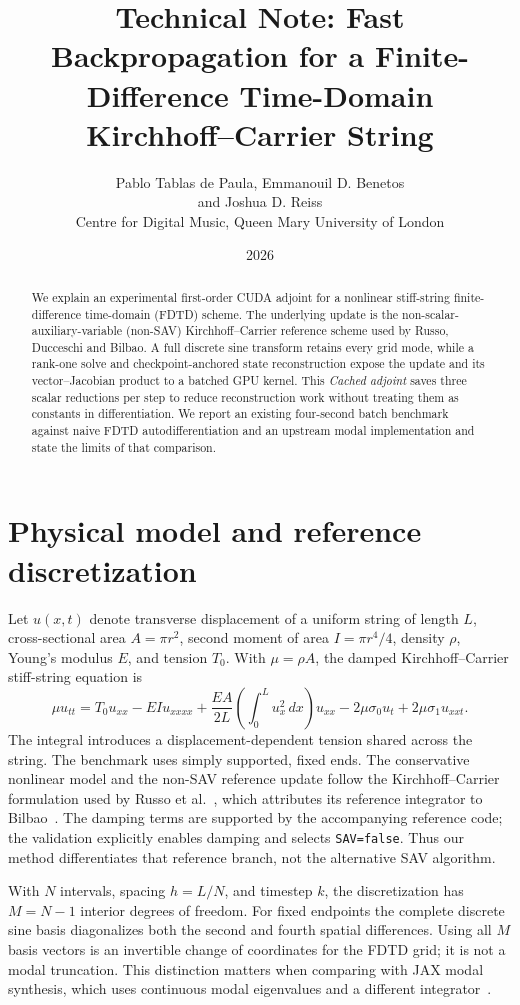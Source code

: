\documentclass[a4paper,10pt]{article}
\title{Technical Note: Fast Backpropagation for a Finite-Difference Time-Domain Kirchhoff--Carrier String}
\author{Pablo Tablas de Paula, Emmanouil D. Benetos\\ and Joshua D. Reiss\\[0.4em] Centre for Digital Music, Queen Mary University of London}
\date{2026}
\begin{document}
\maketitle
\begin{abstract}
We explain an experimental first-order CUDA adjoint for a nonlinear stiff-string finite-difference time-domain (FDTD) scheme. The underlying update is the non-scalar-auxiliary-variable (non-SAV) Kirchhoff--Carrier reference scheme used by Russo, Ducceschi and Bilbao. A full discrete sine transform retains every grid mode, while a rank-one solve and checkpoint-anchored state reconstruction expose the update and its vector--Jacobian product to a batched GPU kernel. This \emph{Cached adjoint} saves three scalar reductions per step to reduce reconstruction work without treating them as constants in differentiation. We report an existing four-second batch benchmark against naive FDTD autodifferentiation and an upstream modal implementation and state the limits of that comparison.
\end{abstract}

\section{Physical model and reference discretization}
Let $u(x,t)$ denote transverse displacement of a uniform string of length $L$, cross-sectional area $A=\pi r^{2}$, second moment of area $I=\pi r^{4}/4$, density $\rho$, Young's modulus $E$, and tension $T_0$. With $\mu=\rho A$, the damped Kirchhoff--Carrier stiff-string equation is
\begin{equation}
 \mu u_{tt}=T_0u_{xx}-EIu_{xxxx}
 +\frac{EA}{2L}\left(\int_0^L u_x^2\,dx\right)u_{xx}
 -2\mu\sigma_0u_t+2\mu\sigma_1u_{xxt}.
 \label{eq:pde}
\end{equation}
The integral introduces a displacement-dependent tension shared across the string. The benchmark uses simply supported, fixed ends. The conservative nonlinear model and the non-SAV reference update follow the Kirchhoff--Carrier formulation used by Russo et al.\ \cite{russo2026}, which attributes its reference integrator to Bilbao\ \cite{bilbao2009}. The damping terms are supported by the accompanying reference code; the validation explicitly enables damping and selects \texttt{SAV=false}. Thus our method differentiates that reference branch, not the alternative SAV algorithm.

With $N$ intervals, spacing $h=L/N$, and timestep $k$, the discretization has $M=N-1$ interior degrees of freedom. For fixed endpoints the complete discrete sine basis diagonalizes both the second and fourth spatial differences. Using all $M$ basis vectors is an invertible change of coordinates for the FDTD grid; it is not a modal truncation. This distinction matters when comparing with JAX modal synthesis, which uses continuous modal eigenvalues and a different integrator\ \cite{diaz2025}.
\end{document}
